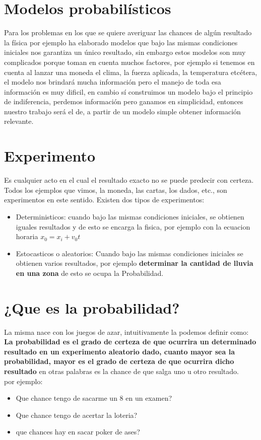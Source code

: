\documentclass[12pt]{book}
\begin{document}
\section{Modelos probabilísticos}Para los problemas en los que se quiere averiguar las chances de algún resultado la física por ejemplo ha elaborado modelos que bajo las mismas condiciones iniciales  nos garantiza un único resultado, sin embargo estos modelos son muy complicados porque toman en cuenta muchos factores, por ejemplo si tenemos en cuenta al lanzar una moneda el clima, la fuerza aplicada, la temperatura etcétera, el modelo nos brindará mucha información pero el manejo de toda esa información es muy dificil, en cambio  sí construimos un modelo bajo el principio de indiferencia, perdemos información pero ganamos en simplicidad, entonces nuestro trabajo será el de, a partir de un modelo simple obtener información relevante.

\section{Experimento}
Es cualquier acto en el cual el resultado exacto no se puede predecir con certeza. Todos los ejemplos que vimos, la moneda, las cartas, los dados, etc., son experimentos en este sentido. Existen dos tipos de experimentos:
\begin{itemize}
\item Deterministicos: cuando bajo las mismas condiciones iniciales, se obtienen iguales resultados y de esto se encarga la fisica, por ejemplo con la ecuacion horaria $x_0 = x_i + v_0 t$

\item Estocasticos o aleatorios: Cuando bajo las mismas condiciones iniciales se obtienen varios resultados, por ejemplo \textbf{determinar la cantidad de lluvia en una zona} de esto se ocupa la Probabilidad.
\end{itemize}
\section{¿Que es la probabilidad?}
La misma nace con los juegos de azar, intuitivamente la podemos definir como:
\textbf{La probabilidad es el grado de certeza de que ocurrira un determinado resultado en un experimento aleatorio dado, cuanto mayor sea la probabilidad, mayor es el grado de certeza de que ocurrira dicho resultado} en otras palabras es la chance de que salga uno u otro resultado.
\\
por ejemplo:
\begin{itemize}
\item Que chance tengo de sacarme un 8 en un examen?
\item Que chance tengo de acertar la loteria?
\item que chances hay en sacar poker de ases?
\end{itemize}
\end{document}
